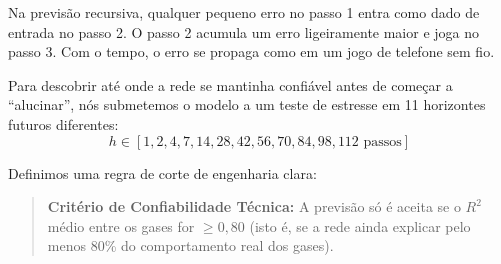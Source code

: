 \documentclass[10pt,a4paper]{article}
\begin{document}
\begin{conceitobox}
Na previsão recursiva, qualquer pequeno erro no passo 1 entra como dado de entrada no passo 2. O passo 2 acumula um erro ligeiramente maior e joga no passo 3. Com o tempo, o erro se propaga como em um jogo de telefone sem fio.

Para descobrir até onde a rede se mantinha confiável antes de começar a ``alucinar'', nós submetemos o modelo a um teste de estresse em 11 horizontes futuros diferentes:
$$h \in [1, 2, 4, 7, 14, 28, 42, 56, 70, 84, 98, 112 \text{ passos}]$$

Definimos uma regra de corte de engenharia clara:
\begin{quote}
\textbf{Critério de Confiabilidade Técnica:} A previsão só é aceita se o $R^2$ médio entre os gases for \textbf{$\ge 0,80$} (isto é, se a rede ainda explicar pelo menos 80\% do comportamento real dos gases).
\end{quote}
\end{conceitobox}
\end{document}

